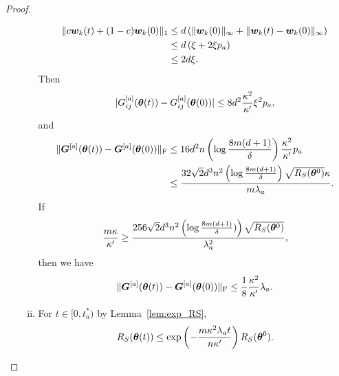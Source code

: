 \documentclass{article}
\begin{document}
\begin{proof}
\begin{enumerate}[(a)]
\begin{enumerate}[(i)]
\begin{equation*}
\begin{aligned}
                                \lVert c\bm{w}_k(t) + (1-c)\bm{w}_k(0)\rVert_1
                                 & \leq d\left(\lVert\bm{w}_k(0)\rVert_{\infty} + \lVert\bm{w}_k(t) - \bm{w}_k(0)\rVert_{\infty}\right) \\
                                 & \leq d\left(\xi+2\xi p_a\right)                                                   \\
                                 & \leq 2d\xi.
                            \end{aligned}
                        \end{equation*}
                        Then
                        \begin{equation*}
                            \lvert G_{ij}^{[a]}(\bm{\theta}(t)) - G_{ij}^{[a]}(\bm{\theta}(0))\rvert \leq 8d^2\frac{\kappa^2}{\kappa'}\xi^2p_a,
                        \end{equation*}
                        and
                        \begin{equation*}
                            \begin{aligned}
                                \lVert\bm{G}^{[a]}(\bm{\theta}(t)) - \bm{G}^{[a]}(\bm{\theta}(0))\rVert_\mathrm{F}
                                 & \leq 16d^2n\left(\log\frac{8m(d+1)}{\delta}\right)\frac{\kappa^2}{\kappa'}p_a                              \\
                                 & \leq\frac{32\sqrt{2}d^3n^2\left(\log\frac{8m(d+1)}{\delta}\right)\sqrt{R_S(\bm{\theta}^0)}\kappa}{m\lambda_a}.
                            \end{aligned}
                        \end{equation*}
                        If
                        \begin{equation*}
                            \frac{m\kappa}{\kappa'}\geq\frac{256\sqrt{2}d^3n^2\left(\log\frac{8m(d+1)}{\delta})\right)\sqrt{R_S(\bm{\theta}^0)}}{\lambda_a^2},
                        \end{equation*}
                        then we have
                        \begin{equation}\label{thm-proof:w-step1}
                            \lVert\bm{G}^{[a]}(\bm{\theta}(t)) - \bm{G}^{[a]}(\bm{\theta}(0))\rVert_\mathrm{F}\leq\frac{1}{8}\frac{\kappa^2}{\kappa'}\lambda_a.
                        \end{equation}
                  \item For $t\in[0,t^*_a)$ by Lemma~\ref{lem:exp_RS},
                        \begin{equation*}
                            \RS(\vtheta(t))\leq\exp\left(-\frac{m\kappa^2\lambda_at}{n\kappa'}\right)\RS(\vtheta^0).

\end{equation*}
\end{enumerate}
\end{enumerate}
\end{proof}
\end{document}
